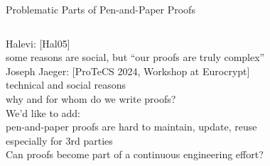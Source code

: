 \begin{frame}{Problematic Parts of Pen-and-Paper Proofs}
\begin{columns}[fullwidth,c]
\begin{column}{.68\linewidth}
      Halevi: [Hal05]\\
      \hspace{1.618em} some reasons are social, but “our proofs are truly complex”\\[1.5em]

      Joseph Jaeger: [ProTeCS 2024, Workshop at Eurocrypt]\\
      \hspace{1.618em} technical and social reasons\\
      \hspace{1.618em} why and for whom do we write proofs?\\[1.5em]%

      We'd like to add:\\
      \hspace{1.618em} pen-and-paper proofs are hard to maintain, update, reuse\\
      \hspace{1.618em} especially for 3rd parties\\[1.5em]%

      Can proofs become part of a continuous engineering effort?%
    \end{column}
  \end{columns}
\end{frame}


%

